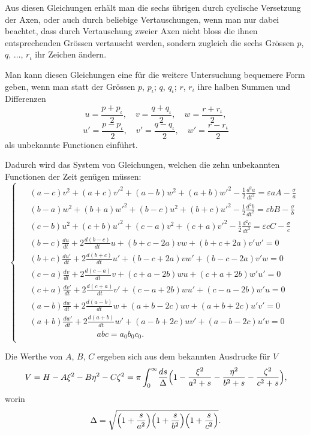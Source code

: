 \documentclass[12pt,a4paper]{book}
\theoremstyle{definition}
\theoremstyle{remark}
\begin{document}
Aus diesen Gleichungen erhält man die sechs übrigen durch cyclische Versetzung der Axen, oder auch durch beliebige Vertauschungen, wenn man nur dabei beachtet, dass durch Vertauschung zweier Axen nicht bloss die ihnen entsprechenden Grössen vertauscht werden, sondern zugleich die sechs Grössen $p$, $q$, $\ldots$, $r_\iota$ ihr Zeichen ändern.

Man kann diesen Gleichungen eine für die weitere Untersuchung bequemere Form geben, wenn man statt der Grössen $p$, $p_\iota$; $q$, $q_\iota$; $r$, $r_\iota$ ihre halben Summen und Differenzen
\[
u = \frac{p+p_\iota}{2},\quad v = \frac{q+q_\iota}{2},\quad w = \frac{r+r_\iota}{2},
\]
\[
u' = \frac{p-p_\iota}{2},\quad v' = \frac{q-q_\iota}{2},\quad w' = \frac{r-r_\iota}{2}
\]
als unbekannte Functionen einführt.

Dadurch wird das System von Gleichungen, welchen die zehn unbekannten Functionen der Zeit genügen müssen:
\begin{equation}
\tag{$\alpha$}
\begin{cases}
\begin{aligned}
&(a-c)v^2 + (a+c)v'^2 + (a-b)w^2 + (a+b)w'^2 - \tfrac{1}{2}\frac{d^2a}{dt^2} = \varepsilon aA - \frac{\sigma}{a}\\
&(b-a)w^2 + (b+a)w'^2 + (b-c)u^2 + (b+c)u'^2 - \tfrac{1}{2}\frac{d^2b}{dt^2} = \varepsilon bB - \frac{\sigma}{b}\\
&(c-b)u^2 + (c+b)u'^2 + (c-a)v^2 + (c+a)v'^2 - \tfrac{1}{2}\frac{d^2c}{dt^2} = \varepsilon cC - \frac{\sigma}{c}\\
&(b-c)\frac{du}{dt} + 2\frac{d(b-c)}{dt}u + (b+c-2a)vw + (b+c+2a)v'w' = 0\\
&(b+c)\frac{du'}{dt} + 2\frac{d(b+c)}{dt}u' + (b-c+2a)vw' + (b-c-2a)v'w = 0\\
&(c-a)\frac{dv}{dt} + 2\frac{d(c-a)}{dt}v + (c+a-2b)wu + (c+a+2b)w'u' = 0\\
&(c+a)\frac{dv'}{dt} + 2\frac{d(c+a)}{dt}v' + (c-a+2b)wu' + (c-a-2b)w'u = 0\\
&(a-b)\frac{dw}{dt} + 2\frac{d(a-b)}{dt}w + (a+b-2c)uv + (a+b+2c)u'v' = 0\\
&(a+b)\frac{dw'}{dt} + 2\frac{d(a+b)}{dt}w' + (a-b+2c)uv' + (a-b-2c)u'v = 0\\
&\qquad\qquad\qquad\qquad abc = a_0b_0c_0.
\end{aligned}
\end{cases}
\end{equation}

Die Werthe von $A$, $B$, $C$ ergeben sich aus dem bekannten Ausdrucke für $V$
\[
V = H - A\xi^2 - B\eta^2 - C\zeta^2 = \pi\int_0^{\infty}\!\frac{ds}{\Delta}\Bigl(1 - \frac{\xi^2}{a^2+s} - \frac{\eta^2}{b^2+s} - \frac{\zeta^2}{c^2+s}\Bigr),
\]
worin
\[
\Delta = \sqrt{\Bigl(1+\frac{s}{a^2}\Bigr)\Bigl(1+\frac{s}{b^2}\Bigr)\Bigl(1+\frac{s}{c^2}\Bigr)}.
\]
\end{document}
